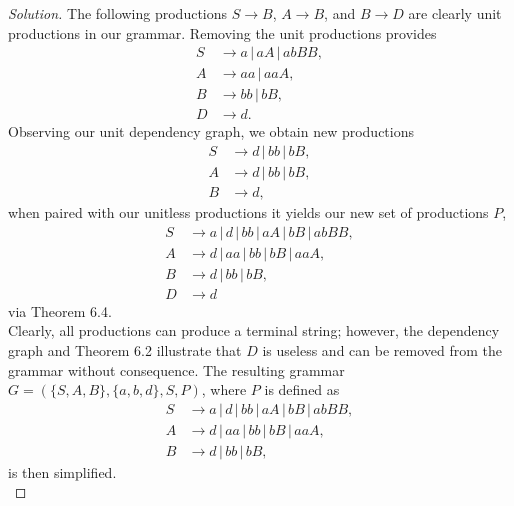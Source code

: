 \documentclass[ 12pt ]{article}
\begin{document}
\begin{enumerate}
\begin{proof}[Solution]
			The following productions $S \to B$, $A \to B$, and $B \to D$ are clearly unit productions in our grammar. Removing the unit productions provides
			\begin{align*}
				S &\to a\, |\, aA\, |\, abBB, \\
				A &\to aa\, |\, aaA, \\
				B &\to bb\, |\, bB, \\
				D &\to d.
			\end{align*}
			Observing our unit dependency graph, we obtain new productions
			\begin{align*}
				S &\to d\, |\, bb\, |\, bB, \\
				A &\to d\, |\, bb\, |\, bB, \\
				B &\to d,
			\end{align*}
			when paired with our unitless productions it yields our new set of productions $P$,
			\begin{align*}
				S &\to a\, |\, d\, |\, bb\, |\, aA\, |\, bB\, |\, abBB, \\
				A &\to d\, |\, aa\, |\, bb\, |\, bB\, |\, aaA, \\
				B &\to d\, |\, bb\, |\, bB, \\
				D &\to d
			\end{align*}
			via Theorem 6.4. \\

			Clearly, all productions can produce a terminal string; however, the dependency graph and Theorem 6.2 illustrate that $D$ is useless and can be removed from the grammar
			without consequence. The resulting grammar $G = (\{ S, A, B \}, \{ a, b, d \}, S, P)$, where $P$ is defined as
			\begin{align*}
				S &\to a\, |\, d\, |\, bb\, |\, aA\, |\, bB\, |\, abBB, \\
				A &\to d\, |\, aa\, |\, bb\, |\, bB\, |\, aaA, \\
				B &\to d\, |\, bb\, |\, bB,
			\end{align*}
			is then simplified. \\


\end{proof}
\end{enumerate}
\end{document}
